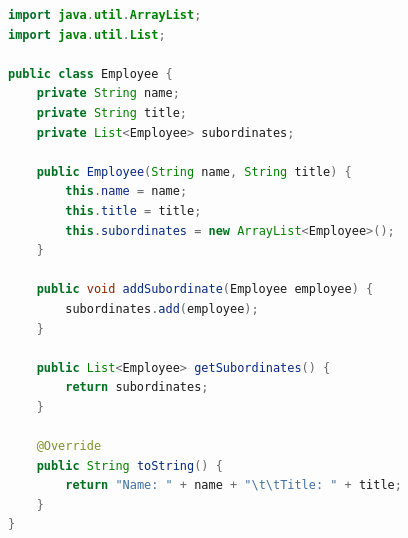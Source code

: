 \begin{figure}[H]
    \centering
\end{figure}

\vspace{0.5cm}

\begin{lstlisting}[language=Java, title=Employee.java]
import java.util.ArrayList;
import java.util.List;

public class Employee {
    private String name;
    private String title;
    private List<Employee> subordinates;

    public Employee(String name, String title) {
        this.name = name;
        this.title = title;
        this.subordinates = new ArrayList<Employee>();
    }

    public void addSubordinate(Employee employee) {
        subordinates.add(employee);
    }

    public List<Employee> getSubordinates() {
        return subordinates;
    }

    @Override
    public String toString() {
        return "Name: " + name + "\t\tTitle: " + title;
    }
}
\end{lstlisting}

